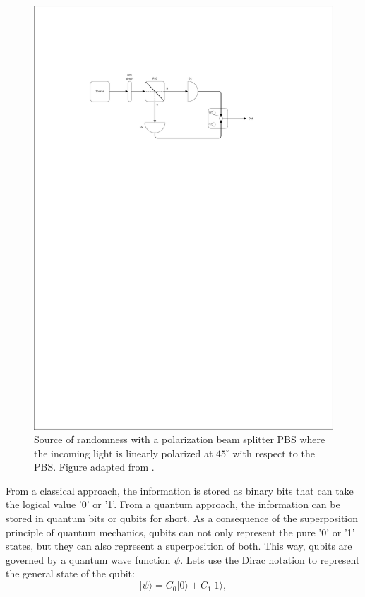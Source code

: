 \begin{figure}[H]
    \centering
        \includegraphics[clip, trim=3cm 20cm 5cm 5cm, width=1.00\textwidth]{./sdf/quantum_random_number_generator/figures/Random_Number_Generator.pdf}
    \caption{Source of randomness with a polarization beam splitter PBS where the incoming light is linearly polarized at $45^{\circ}$ with respect to the PBS. Figure adapted from \cite{Zeilinger}.}\label{qrng}
\end{figure}

From a classical approach, the information is stored as binary bits that can take the logical value '0' or '1'. From a quantum approach, the information can be stored in quantum bits or qubits for short. As a consequence of the superposition principle of quantum mechanics, qubits can not only represent the pure '0' or '1' states, but they can also represent a superposition of both. This way, qubits are governed by a quantum wave function $\psi$. Lets use the Dirac notation to represent the general state of the qubit:
\begin{equation}\label{eq:qubit}
  |\psi\rangle = C_0 |0\rangle + C_1 |1\rangle,
\end{equation}

